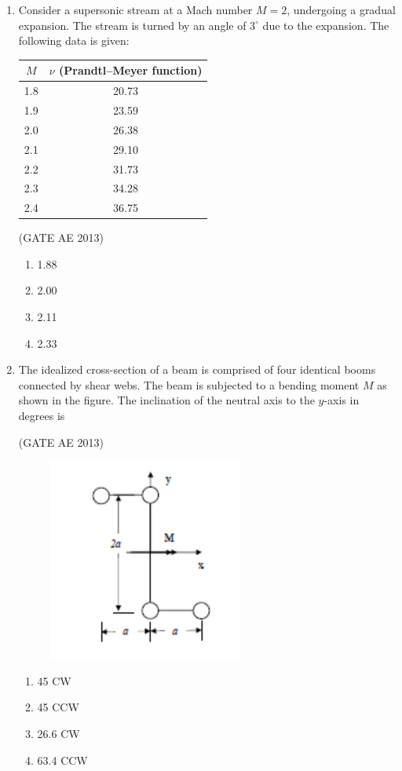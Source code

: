 \documentclass[journal,12pt,onecolumn]{IEEEtran}
\theoremstyle{remark}
\begin{document}
\begin{flushleft}
\begin{enumerate}
\item Consider a supersonic stream at a Mach number $M=2$, undergoing a gradual expansion. The stream is turned by an angle of $3^\circ$ due to the expansion. The following data is given:

\begin{center}
\begin{tabular}{|c|c|}

\hline
$M$ & $\nu$ 
(Prandtl--Meyer function) \\
\hline
1.8 & 20.73 \\
1.9 & 23.59 \\
2.0 & 26.38 \\
2.1 & 29.10 \\
2.2 & 31.73 \\
2.3 & 34.28 \\
2.4 & 36.75 \\
\hline
\end{tabular}
\end{center}
\hfill(GATE AE 2013)

\begin{multicols}{2}
\begin{enumerate}
  \item 1.88
  \item 2.00
  \item 2.11
  \item 2.33
\end{enumerate}
\end{multicols}

\item The idealized cross-section of a beam is comprised of four identical booms connected by shear webs. The beam is subjected to a bending moment $M$ as shown in the figure. The inclination of the neutral axis to the $y$-axis in degrees is

\hfill(GATE AE 2013)
\begin{figure}[H]
    \centering
    \includegraphics[width=0.35\columnwidth]{figs/38.png}
    \caption{}
    \label{fig:placeholder}
\end{figure}
\begin{multicols}{2}
\begin{enumerate}
  \item 45 CW
  \item 45 CCW
  \item 26.6 CW
  \item 63.4 CCW
\end{enumerate}
\end{multicols}


\end{enumerate}
\end{flushleft}
\end{document}
